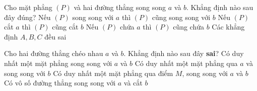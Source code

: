 \begin{ex}%
    Cho mặt phẳng $(P)$ và hai đường thẳng song song $a$ và $b$. Khẳng định nào sau đây đúng?
    \choice
    {Nếu $(P)$ song song với $a$ thì $(P)$ cũng song song với $b$}
    {\True Nếu $(P)$ cắt $a$ thì $(P)$ cũng cắt $b$}
    {Nếu $(P)$ chứa $a$ thì $(P)$ cũng chứa $b$}
    {Các khẳng định $A, B, C$ đều sai}
\end{ex}
\begin{ex}%
    Cho hai đường thẳng chéo nhau $a$ và $b$. Khẳng định nào sau đây \textbf{sai}?
    \choice
    {\True Có duy nhất một mặt phẳng song song với $a$ và $b$}
    {Có duy nhất một mặt phẳng qua $a$ và song song với $b$}
    {Có duy nhất một mặt phẳng qua điểm $M$, song song với $a$ và $b$}
    {Có vô số đường thẳng song song với $a$ và cắt $b$}
\end{ex}
